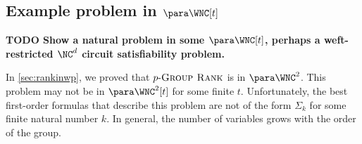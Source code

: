 \documentclass{article}
\newcommand{\todo}[1]{\textbf{TODO #1}}
\newcommand{\dash}{\textnormal{-}}
\newcommand{\pgrouprank}{p\dash\textsc{Group Rank}}
\begin{document}
\subsection{Example problem in \texorpdfstring{$\para \WNC[t]$}{paraWNC[t]}}

\todo{Show a natural problem in some $\para \WNC[t]$, perhaps a weft-restricted $\NC^d$ circuit satisfiability problem.}

In \autoref{sec:rankinwp}, we proved that $\pgrouprank$ is in $\para \WNC^2$.
This problem may not be in $\para \WNC^2[t]$ for some finite $t$.
Unfortunately, the best first-order formulas that describe this problem are not of the form $\Sigma_k$ for some finite natural number $k$.
In general, the number of variables grows with the order of the group.
\end{document}
